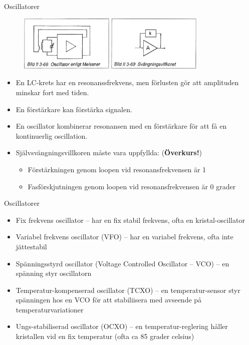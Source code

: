 \documentclass{beamer}
\begin{document}
\begin{frame}{Oscillatorer}

\begin{figure}[h]
\includegraphics[width=0.4\textwidth]{images/bild_2_3-66}
\includegraphics[width=0.4\textwidth]{images/bild_2_3-69}
\end{figure}

\begin{itemize}
\item En LC-krets har en resonanssfrekvens, men förlusten gör att amplituden
  minskar fort med tiden.
\item En förstärkare kan förstärka signalen.
\item En oscillator kombinerar resonansen med en förstärkare för att få en kontinuerlig oscillation.
\item Självsvängningsvillkoren måste vara uppfyllda: (\textbf{Överkurs!})
  \begin{itemize}
  \item Förstärkningen genom loopen vid resonansfrekvensen är 1
  \item Fasförskjutningen genom loopen vid resonansfrekvensen är 0 grader
  \end{itemize}
\end{itemize}
\end{frame}

\begin{frame}{Oscillatorer}
  \begin{itemize}
    \item Fix frekvens oscillator -- har en fix stabil frekvens, ofta en kristal-oscillator
    \item Variabel frekvens oscillator (VFO) -- har en variabel frekvens, ofta inte jättestabil
    \item Spänningsstyrd oscillator (Voltage Controlled Oscillator -- VCO) -- en spänning styr oscillatorn
    \item Temperatur-kompenserad oscillator (TCXO) -- en temperatur-sensor styr spänningen hos en VCO för att stabiliisera med avseende på temperaturvariationer
    \item Ungs-stabiliserad oscillator (OCXO) -- en temperatur-reglering håller kristallen vid en fix temperatur (ofta ca 85 grader celsius)
  \end{itemize}
\end{frame}
\end{document}
